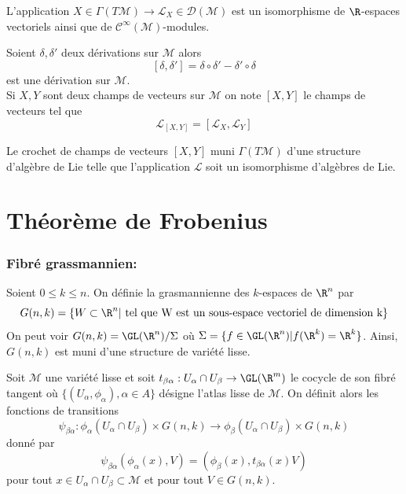 \begin{pro}
L'application $X \in \Gamma(T\mathcal{M}) \to \mathscr{L}_X \in \mathscr{D}(\mathcal{M})$ est un isomorphisme de $\R$-espaces vectoriels ainsi que de $\mathscr{C}^\infty(\mathcal{M})$-modules.
\end{pro}

\begin{defi}
Soient $\delta, \delta'$ deux dérivations sur $\mathcal{M}$ alors
$$[\delta, \delta'] = \delta \circ \delta' - \delta' \circ \delta$$
est une dérivation sur $\mathcal{M}$. \\

Si $X, Y$ sont deux champs de vecteurs sur $\mathcal{M}$ on note $[X, Y]$ le champs de vecteurs tel que 
$$\mathscr{L}_{[X, Y]} = [\mathscr{L}_X, \mathscr{L}_Y]$$
\end{defi}

\begin{pro}
Le crochet de champs de vecteurs $[X, Y]$ muni $\Gamma(T\mathcal{M})$ d'une structure d'algèbre de Lie telle que l'application $\mathscr{L}$ soit un isomorphisme d'algèbres de Lie.
\end{pro}

\newpage
\section{Théorème de Frobenius}

\subsubsection{Fibré grassmannien:}

\begin{defi}[Grasmannienne]
Soient $0\leq k \leq n$. On définie la grasmannienne des $k$-espaces de $\R^n$ par 
$$G(n,k) = \{ W \subset \R^n | \text{ tel que W est un sous-espace vectoriel de dimension k}\}$$ 
On peut voir $G(n,k) = \GL(\R^n) / \Sigma$ où $\Sigma = \{f\in \GL(\R^n) | f(\R^k) = \R^k\}$. Ainsi, $G(n,k)$ est muni d'une structure de variété lisse. \\
\end{defi} 

Soit $\mathcal{M}$ une variété lisse et soit $t_{\beta\alpha} : U_\alpha \cap U_\beta \to \GL(\R^m)$ le cocycle de son fibré tangent où $\{(U_\alpha, \phi_\alpha), \alpha \in A\}$ désigne l'atlas lisse de $\mathcal{M}$. On définit alors les fonctions de transitions 
$$\psi_{\beta\alpha} : \phi_\alpha(U_\alpha\cap U_\beta) \times G(n, k) \to \phi_\beta(U_\alpha \cap U_\beta) \times G(n,k)$$
donné par 
$$\psi_{\beta\alpha}(\phi_\alpha(x), V) = (\phi_\beta(x) , t_{\beta\alpha}(x)V)$$
pour tout $x\in U_\alpha \cap U_\beta \subset \mathcal{M}$ et pour tout $V\in G(n,k)$. \\

